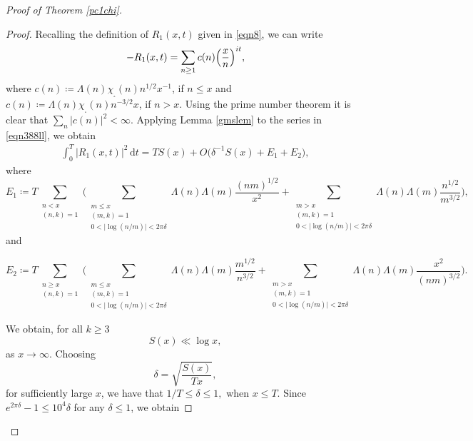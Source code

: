 \documentclass[pdflatex]{sn-jnl}%
\newcommand{\dx}{\mathrm{d}}
\theoremstyle{sltheorems}
\theoremstyle{plainrem}
\theoremstyle{definition}
\begin{document}
\begin{proof}[Proof of Theorem \ref{pc1chi}]
\begin{proof}
Recalling the definition of $R_1(x,t)$ given in \eqref{eqn8}, we can write
\begin{equation}
\label{eqn388ll}
  - R_1(x,t) = \sum_{n  \ge  1} c(n) \Bigl(\frac{x}{n}\Bigr)^{it}, 
   \end{equation}
where 
$c(n) \coloneq	 \Lambda(n) \chi_{_{\square}}(n) n^{1/2}x^{-1}$, if  $n\le x$
and $c(n) \coloneq \Lambda(n) \chi_{_{\square}}(n) n^{-3/2} x$, if $ n> x$.
%
Using the prime number theorem it is clear that $\sum_{n} |c(n)|^2 < \infty.$
%
Applying Lemma \ref{gmslem} to the series in \eqref{eqn388ll}, 
we obtain 
\begin{align}\label{r1ts}
     \int_{0}^T  \vert R_1(x,t) \vert ^2 \, \dx t = T S(x) +
  O\bigl(\delta^{-1} S(x) + E_1 + E_2\bigr),
\end{align}
where
\[
E_1 \coloneq T \sum_{ \substack{n < x \\ (n,k)=1}} \Big( \sum_{\substack{ m \le x
\\ (m,k)=1 \\ 0 <  \vert \log(n/m) \vert <2\pi \delta}}\!\!\!\!\! \Lambda(n) \Lambda(m) \frac{(nm)^{1/2}}{x^2}+
\!\!\!
\sum_{\substack{ m > x \\ (m,k)=1 \\ 0 <  \vert \log(n/m) \vert <2\pi \delta}}\!\!\!\!\! \Lambda(n) \Lambda(m) \frac{n^{1/2}}{m^{3/2}}
\Big),
\]
and

\[
E_2 \coloneq T
\sum_{\substack{n  \ge  x \\ (n,k)=1}}
\Big( \sum_{\substack{ m \le x \\ (m,k)=1 \\ 0 <  \vert \log(n/m) \vert <2\pi \delta}} 
\!\!\!\!\!\!\!\!\!\!\Lambda(n) \Lambda(m) \frac{m^{1/2}}{n^{3/2}} 
+
\!\!\!\!\!\!\!\!\!\!
\sum_{\substack{m > x \\ (m,k)=1  \\ 
0 <  \vert \log(n/m) \vert <2\pi \delta}} 
\!\!\!\!\!\!\!\!\!\Lambda(n) \Lambda(m) \frac{x^2}{(nm)^{3/2}}
\Big).
\]

We obtain, for all $k \ge  3$
%
\begin{equation}
\label{pntsx}
   S(x) \ll \log x,
\end{equation}
%
as $x \to \infty.$
Choosing 
%
\begin{equation}
\label{delta-def}
\delta = \sqrt{\frac{S(x)}{Tx}},
\end{equation}
%
%
for sufficiently large $x$, we have that $1/T \le  \delta \le 1,$
when $ x \le T$.
Since $ e^{2\pi \delta} - 1 \le  10^4 \delta$ for any $\delta \le 1$, we obtain


\end{proof}
\end{proof}
\end{document}
